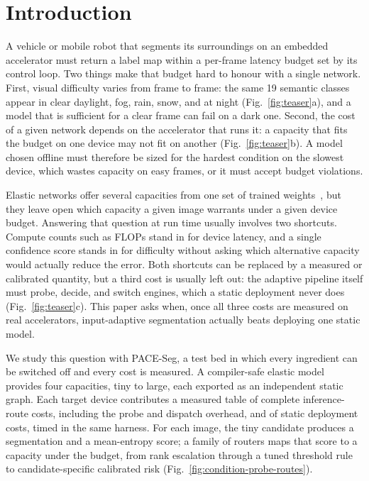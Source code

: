 \documentclass[a4paper,5p]{elsarticle}
\newcommand{\method}{PACE-Seg}
\begin{document}
\section{Introduction}
\label{sec:introduction}

A vehicle or mobile robot that segments its surroundings on an embedded accelerator must return a label map within a per-frame latency budget set by its control loop. Two things make that budget hard to honour with a single network. First, visual difficulty varies from frame to frame: the same 19 semantic classes appear in clear daylight, fog, rain, snow, and at night (Fig.~\ref{fig:teaser}a), and a model that is sufficient for a clear frame can fail on a dark one. Second, the cost of a given network depends on the accelerator that runs it: a capacity that fits the budget on one device may not fit on another (Fig.~\ref{fig:teaser}b). A model chosen offline must therefore be sized for the hardest condition on the slowest device, which wastes capacity on easy frames, or it must accept budget violations.

Elastic networks offer several capacities from one set of trained weights~\cite{yu2019usnet,cai2020ofa}, but they leave open which capacity a given image warrants under a given device budget. Answering that question at run time usually involves two shortcuts. Compute counts such as FLOPs stand in for device latency, and a single confidence score stands in for difficulty without asking which alternative capacity would actually reduce the error. Both shortcuts can be replaced by a measured or calibrated quantity, but a third cost is usually left out: the adaptive pipeline itself must probe, decide, and switch engines, which a static deployment never does (Fig.~\ref{fig:teaser}c). This paper asks when, once all three costs are measured on real accelerators, input-adaptive segmentation actually beats deploying one static model.

We study this question with \method{}, a test bed in which every ingredient can be switched off and every cost is measured. A compiler-safe elastic model provides four capacities, tiny to large, each exported as an independent static graph. Each target device contributes a measured table of complete inference-route costs, including the probe and dispatch overhead, and of static deployment costs, timed in the same harness. For each image, the tiny candidate produces a segmentation and a mean-entropy score; a family of routers maps that score to a capacity under the budget, from rank escalation through a tuned threshold rule to candidate-specific calibrated risk (Fig.~\ref{fig:condition-probe-routes}).
\end{document}
